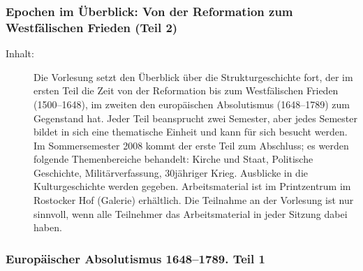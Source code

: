 \documentclass[%
a4paper, %
11pt,               %
leqno,              %
fleqn,              %
]
{scrartcl}
\begin{document}

\subsubsection{Epochen im Überblick: Von der Reformation zum Westfälischen
Frieden (Teil 2)} %
\label{ssub:Epochen im Überblick: Von der Reformation zum Westfälischen Frieden
(Teil 2)}

\begin{description}
  \item[Inhalt:] Die Vorlesung setzt den Überblick über die Strukturgeschichte
    fort, der im ersten Teil die Zeit von der Reformation bis zum Westfälischen
    Frieden (1500--1648), im zweiten den europäischen Absolutismus (1648--1789)
    zum Gegenstand hat. Jeder Teil beansprucht zwei Semester, aber jedes
    Semester bildet in sich eine thematische Einheit und kann für sich besucht
    werden. Im Sommersemester 2008 kommt der erste Teil zum Abschluss; es werden
    folgende Themenbereiche behandelt: Kirche und Staat, Politische Geschichte,
    Militärverfassung, 30jähriger Krieg. Ausblicke in die Kulturgeschichte
    werden gegeben. Arbeitsmaterial ist im Printzentrum im Rostocker Hof
    (Galerie) erhältlich. Die Teilnahme an der Vorlesung ist nur sinnvoll, wenn
    alle Teilnehmer das Arbeitsmaterial in jeder Sitzung dabei haben.
\end{description}


\subsubsection{Europäischer Absolutismus 1648--1789. Teil 1} %
\label{ssub:Europäischer Absolutismus 1648--1789. Teil 1}
\end{document}
